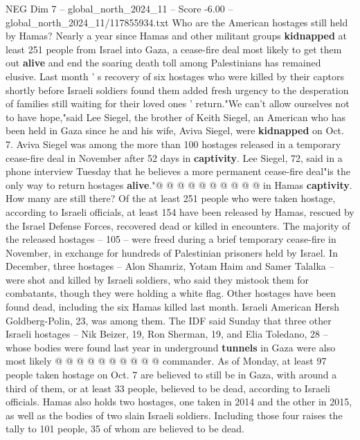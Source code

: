 \begin{textsample}{NEG Dim 7 – global\_north\_2024\_11 – Score -6.00 – global\_north\_2024\_11/117855934.txt}  \label{ex:f7_neg_260}
Who are the American hostages still held by Hamas?
Nearly a year since Hamas and other militant groups \textbf{kidnapped} at least 251 people from Israel into Gaza, a cease-fire deal most likely to get them out \textbf{alive} and end the soaring death toll among Palestinians has remained elusive.
Last month ' s recovery of six hostages who were killed by their captors shortly before Israeli soldiers found them added fresh urgency to the desperation of families still waiting for their loved ones ' return."We can't allow ourselves not to have hope,"said Lee Siegel, the brother of Keith Siegel, an American who has been held in Gaza since he and his wife, Aviva Siegel, were \textbf{kidnapped} on Oct. 7.
Aviva Siegel was among the more than 100 hostages released in a temporary cease-fire deal in November after 52 days in \textbf{captivity}.
Lee Siegel, 72, said in a phone interview Tuesday that he believes a more permanent cease-fire deal"is the only way to return hostages \textbf{alive}."@ @ @ @ @ @ @ @ @ @ in Hamas \textbf{captivity}.
How many are still there?
Of the at least 251 people who were taken hostage, according to Israeli officials, at least 154 have been released by Hamas, rescued by the Israel Defense Forces, recovered dead or killed in encounters.
The majority of the released hostages -- 105 -- were freed during a brief temporary cease-fire in November, in exchange for hundreds of Palestinian prisoners held by Israel.
In December, three hostages -- Alon Shamriz, Yotam Haim and Samer Talalka -- were shot and killed by Israeli soldiers, who said they mistook them for combatants, though they were holding a white flag.
Other hostages have been found dead, including the six Hamas killed last month.
Israeli American Hersh Goldberg-Polin, 23, was among them.
The IDF said Sunday that three other Israeli hostages -- Nik Beizer, 19, Ron Sherman, 19, and Elia Toledano, 28 -- whose bodies were found last year in underground \textbf{tunnels} in Gaza were also most likely @ @ @ @ @ @ @ @ @ @ commander.
As of Monday, at least 97 people taken hostage on Oct. 7 are believed to still be in Gaza, with around a third of them, or at least 33 people, believed to be dead, according to Israeli officials.
Hamas also holds two hostages, one taken in 2014 and the other in 2015, as well as the bodies of two slain Israeli soldiers.
Including those four raises the tally to 101 people, 35 of whom are believed to be dead.

\end{textsample}

